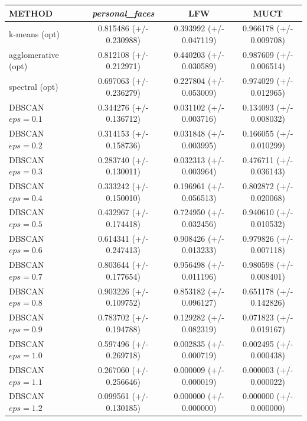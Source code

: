 \documentclass[conference]{IEEEtran}
\begin{document}
\begin{table}[t]
  \centering
  \begin{tabular}{ | l*{4}{c} | }
    \hline
    METHOD               & \vline & \textit{personal\_faces} & LFW & MUCT \\
    \hline
    k-means (opt)        & \vline & 0.815486 (+/- 0.230988) & 0.393992 (+/- 0.047119) & 0.966178 (+/- 0.009708) \\
    agglomerative (opt)  & \vline & 0.812108 (+/- 0.212971) & 0.440203 (+/- 0.030589) & 0.987609 (+/- 0.006514) \\
    spectral (opt)       & \vline & 0.697063 (+/- 0.236279) & 0.227804 (+/- 0.053009) & 0.974029 (+/- 0.012965) \\
    \hline
    DBSCAN $eps = 0.1$   & \vline & 0.344276 (+/- 0.136712) & 0.031102 (+/- 0.003716) & 0.134093 (+/- 0.008032) \\
    DBSCAN $eps = 0.2$   & \vline & 0.314153 (+/- 0.158736) & 0.031848 (+/- 0.003995) & 0.166055 (+/- 0.010299) \\
    DBSCAN $eps = 0.3$   & \vline & 0.283740 (+/- 0.130011) & 0.032313 (+/- 0.003964) & 0.476711 (+/- 0.036143) \\
    DBSCAN $eps = 0.4$   & \vline & 0.333242 (+/- 0.150010) & 0.196961 (+/- 0.056513) & 0.802872 (+/- 0.020068) \\
    DBSCAN $eps = 0.5$   & \vline & 0.432967 (+/- 0.174418) & 0.724950 (+/- 0.032456) & 0.940610 (+/- 0.010532) \\
    DBSCAN $eps = 0.6$   & \vline & 0.614341 (+/- 0.247413) & 0.908426 (+/- 0.013233) & 0.979826 (+/- 0.007118) \\
    DBSCAN $eps = 0.7$   & \vline & 0.803644 (+/- 0.177654) & 0.956498 (+/- 0.011196) & 0.980598 (+/- 0.008401) \\
    DBSCAN $eps = 0.8$   & \vline & 0.903226 (+/- 0.109752) & 0.853182 (+/- 0.096127) & 0.651178 (+/- 0.142826) \\
    DBSCAN $eps = 0.9$   & \vline & 0.783702 (+/- 0.194788) & 0.129282 (+/- 0.082319) & 0.071823 (+/- 0.019167) \\
    DBSCAN $eps = 1.0$   & \vline & 0.597496 (+/- 0.269718) & 0.002835 (+/- 0.000719) & 0.002495 (+/- 0.000438) \\
    DBSCAN $eps = 1.1$   & \vline & 0.267060 (+/- 0.256646) & 0.000009 (+/- 0.000019) & 0.000003 (+/- 0.000022) \\
    DBSCAN $eps = 1.2$   & \vline & 0.099561 (+/- 0.130185) & 0.000000 (+/- 0.000000) & 0.000000 (+/- 0.000000) \\

\end{tabular}
\end{table}
\end{document}

